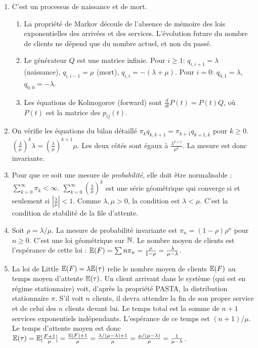 \documentclass[]{exercices}
\begin{document}
\begin{solution}
\begin{enumerate}
    \item C'est un processus de naissance et de mort.
    \begin{enumerate}
        \item La propriété de Markov découle de l'absence de mémoire des lois exponentielles des arrivées et des services. L'évolution future du nombre de clients ne dépend que du nombre actuel, et non du passé.
        \item Le générateur $Q$ est une matrice infinie. Pour $i \ge 1$: $q_{i, i+1} = \lambda$ (naissance), $q_{i, i-1} = \mu$ (mort), $q_{i,i} = -(\lambda+\mu)$. Pour $i=0$: $q_{0,1}=\lambda$, $q_{0,0}=-\lambda$.
        \item Les équations de Kolmogorov (forward) sont $\frac{d}{dt} P(t) = P(t)Q$, où $P(t)$ est la matrice des $p_{ij}(t)$.
    \end{enumerate}
    \item On vérifie les équations du bilan détaillé $\pi_k q_{k, k+1} = \pi_{k+1} q_{k+1, k}$ pour $k \ge 0$.
    $(\frac{\lambda}{\mu})^k \lambda = (\frac{\lambda}{\mu})^{k+1} \mu$. Les deux côtés sont égaux à $\frac{\lambda^{k+1}}{\mu^k}$. La mesure est donc invariante.
    \item Pour que ce soit une mesure de \emph{probabilité}, elle doit être normalisable : $\sum_{k=0}^\infty \pi_k < \infty$.
    $\sum_{k=0}^\infty (\frac{\lambda}{\mu})^k$ est une série géométrique qui converge si et seulement si $|\frac{\lambda}{\mu}| < 1$. Comme $\lambda, \mu > 0$, la condition est $\lambda < \mu$. C'est la condition de stabilité de la file d'attente.
    \item Soit $\rho = \lambda/\mu$. La mesure de probabilité invariante est $\pi_n = (1-\rho)\rho^n$ pour $n \ge 0$. C'est une loi géométrique sur $\mathbb{N}$. Le nombre moyen de clients est l'espérance de cette loi : $\mathbb{E}(F) = \sum n\pi_n = \frac{\rho}{1-\rho} = \frac{\lambda}{\mu-\lambda}$.
    \item La loi de Little $\mathbb{E}(F) = \lambda \mathbb{E}(\tau)$ relie le nombre moyen de clients $\mathbb{E}(F)$ au temps moyen d'attente $\mathbb{E}(\tau)$. Un client arrivant dans le système (qui est en régime stationnaire) voit, d'après la propriété PASTA, la distribution stationnaire $\pi$. S'il voit $n$ clients, il devra attendre la fin de son propre service et de celui des $n$ clients devant lui. Le temps total est la somme de $n+1$ services exponentiels indépendants. L'espérance de ce temps est $(n+1)/\mu$. Le temps d'attente moyen est donc $\mathbb{E}(\tau) = \mathbb{E}[\frac{F+1}{\mu}] = \frac{\mathbb{E}(F)+1}{\mu} = \frac{\lambda/(\mu-\lambda)+1}{\mu} = \frac{\mu/(\mu-\lambda)}{\mu} = \frac{1}{\mu-\lambda}$.

\end{enumerate}
\end{solution}
\end{document}
